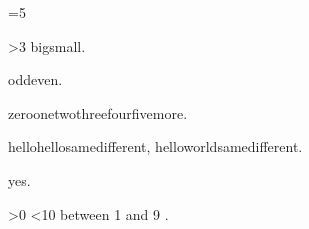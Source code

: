 =5
\def\result{}

\ifnum{}>3 big\else small\fi.

\ifodd{} odd\else even\fi.

\ifcase{} zero\or one\or two\or three\or four\or five\else more\fi.

\def\a{hello}\def\b{hello}\def\c{world}
\ifx\a\b same\else different\fi,
\ifx\a\c same\else different\fi.

\iftrue yes\fi .

\ifnum{}>0
  \ifnum{}<10 between 1 and 9\fi
\fi.

\bye
